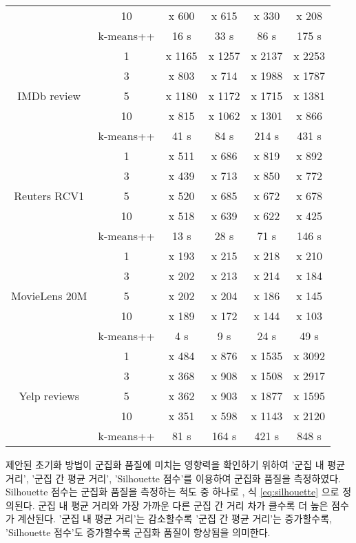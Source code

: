 \documentclass[oneside, ko,phd]{snuthesis_utf8_kor}
\begin{document}
\begin{table}[H]
\begin{tabular}{|c|c|c|c|c|c|}
 & 10 & x 600 & x 615 & x 330 & x 208 \\ \cline{2-6} 
 & k-means++ & 16 s & 33 s & 86 s & 175 s \\ \hline
\multirow{5}{*}{IMDb review} & 1 & x 1165 & x 1257 & x 2137 & x 2253 \\ \cline{2-6} 
 & 3 & x 803 & x 714 & x 1988 & x 1787 \\ \cline{2-6} 
 & 5 & x 1180 & x 1172 & x 1715 & x 1381 \\ \cline{2-6} 
 & 10 & x 815 & x 1062 & x 1301 & x 866 \\ \cline{2-6} 
 & k-means++ & 41 s & 84 s & 214 s & 431 s \\ \hline
\multirow{5}{*}{Reuters RCV1} & 1 & x 511 & x 686 & x 819 & x 892 \\ \cline{2-6} 
 & 3 & x 439 & x 713 & x 850 & x 772 \\ \cline{2-6} 
 & 5 & x 520 & x 685 & x 672 & x 678 \\ \cline{2-6} 
 & 10 & x 518 & x 639 & x 622 & x 425 \\ \cline{2-6} 
 & k-means++ & 13 s & 28 s & 71 s & 146 s \\ \hline
\multirow{5}{*}{MovieLens 20M} & 1 & x 193 & x 215 & x 218 & x 210 \\ \cline{2-6} 
 & 3 & x 202 & x 213 & x 214 & x 184 \\ \cline{2-6} 
 & 5 & x 202 & x 204 & x 186 & x 145 \\ \cline{2-6} 
 & 10 & x 189 & x 172 & x 144 & x 103 \\ \cline{2-6} 
 & k-means++ & 4 s & 9 s & 24 s & 49 s \\ \hline
\multirow{5}{*}{Yelp reviews} & 1 & x 484 & x 876 & x 1535 & x 3092 \\ \cline{2-6} 
 & 3 & x 368 & x 908 & x 1508 & x 2917 \\ \cline{2-6} 
 & 5 & x 362 & x 903 & x 1877 & x 1595 \\ \cline{2-6} 
 & 10 & x 351 & x 598 & x 1143 & x 2120 \\ \cline{2-6} 
 & k-means++ & 81 s & 164 s & 421 s & 848 s \\ \hline
\end{tabular}
\end{table}

제안된 초기화 방법이 군집화 품질에 미치는 영향력을 확인하기 위하여 '군집 내 평균 거리', '군집 간 평균 거리', 'Silhouette 점수'를 이용하여 군집화 품질을 측정하였다.
Silhouette 점수는 군집화 품질을 측정하는 척도 중 하나로 \cite{rousseeuw1987silhouettes, lewis2012human}, 식 \ref{eq:silhouette} 으로 정의된다.
군집 내 평균 거리와 가장 가까운 다른 군집 간 거리 차가 클수록 더 높은 점수가 계산된다.
'군집 내 평균 거리'는 감소할수록 '군집 간 평균 거리'는 증가할수록, 'Silhouette 점수'도 증가할수록 군집화 품질이 향상됨을 의미한다.
\end{document}
